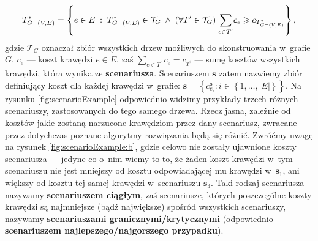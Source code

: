 \begin{equation}
	T^{\ast}_{G = \left( V, E \right)} = \left\{ e \in E \; : \; T^{\ast}_{G = \left( V, E \right)} \in \mathcal{T}_{G} \; \wedge \; \left( \forall T^{\prime} \in \mathcal{T}_{G} \right) \; \sum_{ \mathclap{e \in T^{\prime} }} c_{e} \geqslant c_{ T^{\ast}_{ G = \left( V, E \right) } } \right\}\text{,}
\end{equation}
gdzie $\mathcal{T}_{G}$ oznaczał zbiór wszystkich drzew możliwych do skonstruowania w~grafie $G$, $c_{e}$ --- koszt krawędzi $e \in E$, zaś $\sum_{ e \in T^{\prime} } c_{e} = c_{T^{\prime}}$ --- sumę kosztów wszystkich krawędzi, która wynika ze \textbf{scenariusza}.
Scenariuszem $\textbf{s}$ zatem nazwiemy zbiór definiujący koszt dla każdej krawędzi w~grafie: $\textbf{s} = \left\{ c^{\textbf{s}}_{e_{i}} : i \in \left\{ 1, \dots, \left| E \right| \right\} \right\}$.
Na rysunku \ref{fig:scenarioExample} odpowiednio widzimy przykłady trzech różnych scenariuszy, zastosowanych do tego samego drzewa.
Rzecz jasna, zależnie od kosztów jakie zostaną narzucone krawędziom przez dany scenariusz, zwracane przez dotychczas poznane algorytmy rozwiązania będą się różnić.
Zwróćmy uwagę na rysunek \ref{fig:scenarioExample:b}, gdzie celowo nie zostały ujawnione koszty scenariusza --- jedyne co o~nim wiemy to to, że żaden koszt krawędzi w~tym scenariuszu nie jest mniejszy od kosztu odpowiadającej mu krawędzi w~$\textbf{s}_{1}$, ani większy od kosztu tej samej krawędzi w~scenariuszu $\textbf{s}_{3}$.
Taki rodzaj scenariusza nazywamy \textbf{scenariuszem ciągłym}, zaś scenariusze, których poszczególne koszty krawędzi są najmniejsze (bądź największe) spośród wszystkich scenariuszy, nazywamy \textbf{scenariuszami granicznymi/krytycznymi} (odpowiednio \textbf{scenariuszem najlepszego/najgorszego przypadku}).

